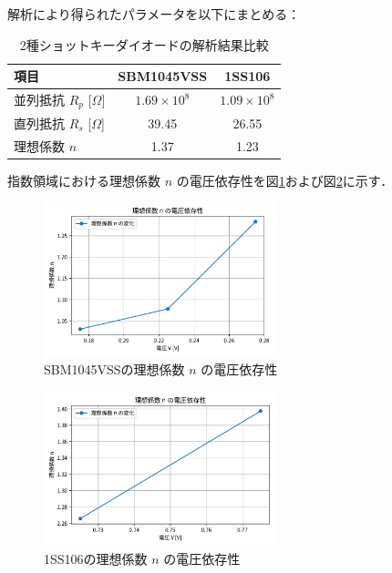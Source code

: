 解析により得られたパラメータを以下にまとめる：

\begin{table}[H]
    \centering
    \caption{2種ショットキーダイオードの解析結果比較}
    \begin{tabular}{lcc}
        \hline
        項目 & SBM1045VSS & 1SS106 \\
        \hline
        並列抵抗 \( R_p \) [\(\Omega\)] & \( 1.69 \times 10^8 \) & \( 1.09 \times 10^8 \) \\
        直列抵抗 \( R_s \) [\(\Omega\)] & 39.45 & 26.55 \\
        理想係数 \( n \) & 1.37 & 1.23 \\
        \hline
    \end{tabular}
\end{table}

指数領域における理想係数 \( n \) の電圧依存性を図\ref{fig:n_vs_v}および図\ref{fig:n_small}に示す．

\begin{figure}[H]
    \centering
    \includegraphics[width=0.6\textwidth]{figure/Figure_2.pdf}
    \caption{SBM1045VSSの理想係数 \( n \) の電圧依存性}
    \label{fig:n_vs_v}
\end{figure}

\begin{figure}[H]
    \centering
    \includegraphics[width=0.6\textwidth]{figure/Figure_4.pdf}
    \caption{1SS106の理想係数 \( n \) の電圧依存性}
    \label{fig:n_small}
\end{figure}

